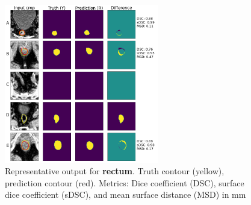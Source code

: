 \documentclass[9pt]{beamer}
\begin{document}
%
\begin{frame}{}
  \begin{figure}
    \includegraphics[width=0.60\textwidth]{images/prostate_rectum}
    \caption{Representative output for \textbf{rectum}. Truth contour (yellow),
      prediction contour (red).
      Metrics: Dice coefficient (DSC), surface dice coefficient (sDSC), and mean
      surface distance (MSD) in mm}
  \end{figure}
\end{frame}
%
%   
%
\end{document}
